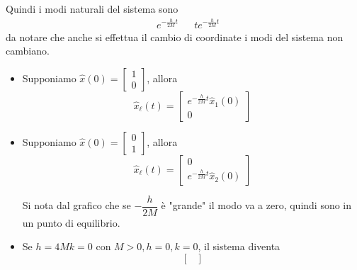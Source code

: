 \documentclass{article}
\numberwithin{equation}{subsection}
\begin{document}
Quindi i modi naturali del sistema sono
\begin{align*}
    &e^{- \frac{h}{2M}t} & &t e^{- \frac{h}{2M}t}  
\end{align*}
da notare che anche si effettua il cambio di coordinate i modi del sistema non cambiano.
\begin{itemize}
    \item Supponiamo $\hat x(0) = \begin{bmatrix} 1\\0 \end{bmatrix}$, allora
    \begin{equation}
        \hat x_\ell (t) = 
        \begin{bmatrix}
            e^{- \frac{h}{2M}t} \hat x_1(0)\\0
        \end{bmatrix}
    \end{equation}
    \item Supponiamo $\hat x(0) = \begin{bmatrix} 0\\1 \end{bmatrix}$, allora
    \begin{equation}
        \hat x_\ell (t) = 
        \begin{bmatrix}
            0\\e^{- \frac{h}{2M}t} \hat x_2(0)
        \end{bmatrix}
    \end{equation}
    \begin{center}
    \end{center}
    Si nota dal grafico che se $- \dfrac{h}{2M}$ è "grande" il modo va a zero, quindi sono in un punto di equilibrio.
    \item Se $h = 4Mk = 0$ con $M >0,h=0,k=0$, il sistema diventa
    \begin{equation}
        \begin{bmatrix}

\end{bmatrix}
\end{equation}
\end{itemize}
\end{document}
